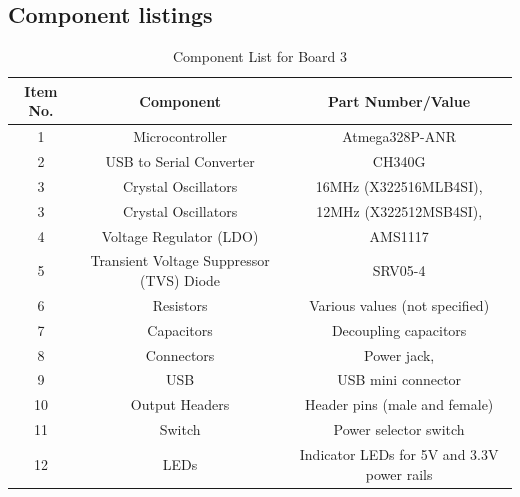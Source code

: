 \documentclass[a4paper,11pt]{article}%
\begin{document}
\subsection{Component listings}
\begin{table}[H]
	\centering
	\caption{Component List for Board 3}
	\begin{tabular}{|c|c|c|}
		\hline
		\textbf{Item No.} & \textbf{Component}                       & \textbf{Part Number/Value}                 \\\hline
		1                 & Microcontroller                          & Atmega328P-ANR                             \\\hline
		2                 & USB to Serial Converter                  & CH340G                                     \\\hline
		3                 & Crystal Oscillators                      & 16MHz (X322516MLB4SI),                     \\\hline
		3                 & Crystal Oscillators                      & 12MHz (X322512MSB4SI),                     \\\hline
		4                 & Voltage Regulator (LDO)                  & AMS1117                                    \\\hline
		5                 & Transient Voltage Suppressor (TVS) Diode & SRV05-4                                    \\\hline
		6                 & Resistors                                & Various values (not specified)             \\\hline
		7                 & Capacitors                               & Decoupling capacitors                      \\\hline
		8                 & Connectors                               & Power jack,                                \\ \hline
		9                 & USB                                      & USB mini connector                         \\ \hline
		10                & Output Headers                           & Header pins (male and female)              \\\hline
		11                & Switch                                   & Power selector switch                      \\\hline
		12                & LEDs                                     & Indicator LEDs for 5V and 3.3V power rails \\\hline
	\end{tabular}
	\label{tab:component_list}
\end{table}
\end{document}
